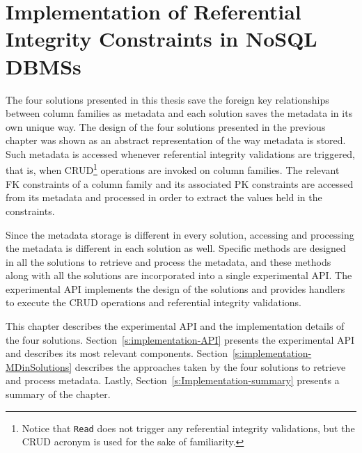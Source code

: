 \chapter{Implementation of Referential Integrity Constraints in NoSQL DBMSs}
\label{c:Implementation}

The four solutions presented in this thesis save the foreign key relationships
between column families as metadata and each solution saves the metadata in its
own unique way.  The design of the four solutions presented in the previous
chapter was shown as an  abstract representation of the way metadata is stored.
Such metadata is accessed whenever referential integrity validations are
triggered, that is, when \ac{CRUD}\footnote{Notice that \texttt{Read} does not
trigger any referential integrity validations, but the \ac{CRUD} acronym is
used for the sake of familiarity.} operations
are invoked on column families. The relevant  \ac{FK} constraints of a column
family and its associated \ac{PK} constraints are accessed from its metadata and
processed in order to extract the values held in the constraints.

Since the metadata storage is different in
every solution, accessing and processing the  metadata is different in each
solution as well. 
Specific methods are designed in all the solutions to retrieve and process the
metadata, and these methods along with all the
solutions are incorporated into a single experimental \ac{API}. The
experimental \ac{API} implements the design of the solutions and provides
handlers to execute the \ac{CRUD} operations and referential
integrity validations. 

This chapter describes  the experimental \ac{API} and
the implementation details of the  four solutions.
Section~\ref{s:implementation-API} presents the experimental \ac{API} and
describes its most relevant components.
Section~\ref{s:implementation-MDinSolutions} describes the approaches taken by
the four solutions to retrieve and process metadata.
Lastly, Section~\ref{s:Implementation-summary} presents a summary of the
chapter.
 

